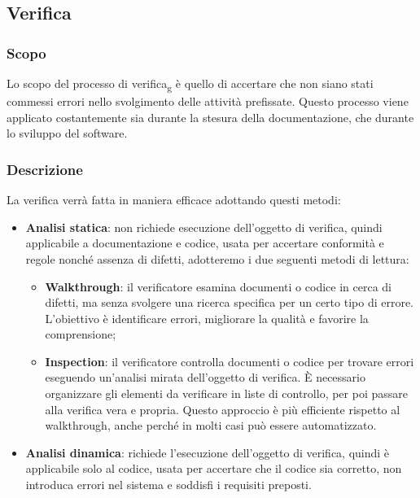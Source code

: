 \subsection{Verifica}
\subsubsection{Scopo}
Lo scopo del processo di verifica\textsubscript{g} è quello di accertare che
non siano stati commessi errori nello svolgimento delle attività prefissate.
Questo processo viene applicato costantemente sia durante la stesura della
documentazione, che durante lo sviluppo del software.
\subsubsection{Descrizione}
La verifica verrà fatta in maniera efficace adottando questi metodi:
\begin{itemize}
      \item \textbf{Analisi statica}: non richiede esecuzione dell'oggetto di verifica, quindi applicabile a documentazione e codice, usata per accertare conformità e regole nonché assenza di difetti, adotteremo i due seguenti metodi di lettura:
            \begin{itemize}
                  \item \textbf{Walkthrough}: il verificatore esamina documenti o codice in cerca di difetti, ma senza svolgere una
                        ricerca specifica per un certo tipo di errore. L'obiettivo è identificare errori, migliorare la qualità e favorire la comprensione;
                  \item \textbf{Inspection}: il verificatore controlla documenti o codice per trovare errori
                        eseguendo un'analisi mirata dell'oggetto di verifica. È necessario organizzare gli elementi da verificare in liste di controllo,
                        per poi passare alla verifica vera e propria. Questo approccio è più efficiente rispetto al walkthrough, 
                        anche perché in molti casi può essere automatizzato.
            \end{itemize}
      \item \textbf{Analisi dinamica}: richiede l'esecuzione dell'oggetto di verifica, quindi è applicabile solo al codice, usata per accertare che il codice sia corretto, non introduca errori nel sistema e soddisfi i requisiti preposti.
\end{itemize}
